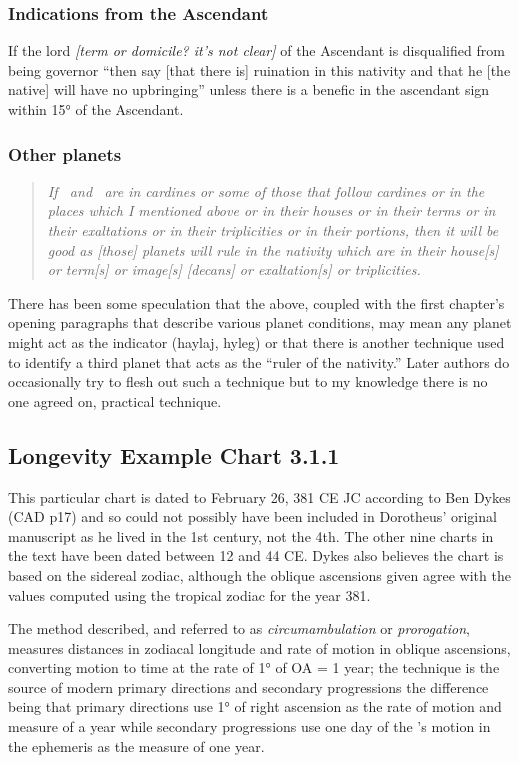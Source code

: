 \subsubsection{Indications from the Ascendant}
If  the lord \textsl{[term or domicile? it's not clear]} of the Ascendant is disqualified from being governor ``then say [that there is] ruination in this nativity and that he [the native] will have no upbringing'' unless there is a benefic in the ascendant sign within 15° of the Ascendant.

\subsubsection{Other planets}
\begin{quote}
\textsl{ If \Mars\, and \Jupiter\, are in cardines or some of those that follow cardines or in the places which I mentioned above or in their houses or in their terms or in their exaltations or in their triplicities or in their portions, then it will be good as [those] planets will rule in the nativity which are in their house[s] or term[s] or image[s] [decans] or exaltation[s] or triplicities.}
\end{quote}

There has been some speculation that the above, coupled with the first chapter's opening paragraphs that describe various planet conditions, may mean any planet might act as the indicator (haylaj, hyleg) or that there is another technique used to identify a third planet that acts as the ``ruler of the nativity.'' Later authors do occasionally try to flesh out such a technique but to my knowledge there is no one agreed on, practical technique.

\newpage
\subsection{Longevity Example Chart 3.1.1}
\label{sec:longevity}
\vspace{0.5em}
\begin{mdframed}[backgroundcolor=cyan!5, rightmargin=1em, leftmargin=1em]
This particular chart is dated to February 26, 381 CE JC according to Ben Dykes (CAD p17) and so could not possibly have been included in Dorotheus' original manuscript as he lived in the 1st century, not the 4th. The other nine charts in the text have been dated between 12 and 44 CE. Dykes also believes the chart is based on the sidereal zodiac, although the oblique ascensions given agree with the values computed using the tropical zodiac for the year 381.

The method described, and referred to as \textsl{circumambulation} or \textsl{prorogation}, measures distances in zodiacal longitude and rate of motion in oblique ascensions, converting motion to time at the rate of 1° of OA = 1 year; the technique is the source of modern primary directions and secondary progressions the difference being that primary directions use 1° of right ascension as the rate of motion and measure of a year while secondary progressions use one day of the \Sun's motion in the ephemeris as the measure of one year.
\end{mdframed}

